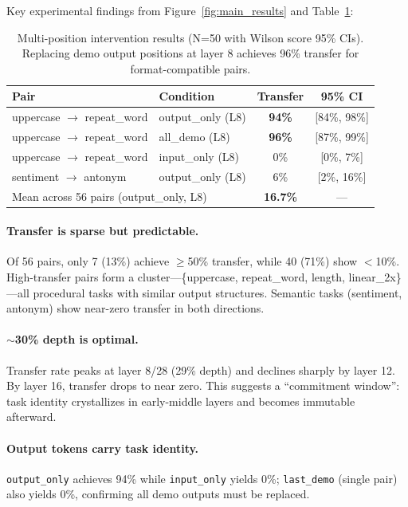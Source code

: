 \documentclass{article}
\begin{document}
Key experimental findings from Figure~\ref{fig:main_results} and Table~\ref{tab:multi}:

\begin{table}[t]
\caption{Multi-position intervention results (N=50 with Wilson score 95\% CIs). Replacing demo output positions at layer 8 achieves 96\% transfer for format-compatible pairs.}
\label{tab:multi}
\centering
\small
\begin{tabular}{@{}llcc@{}}
\toprule
Pair & Condition & Transfer & 95\% CI \\
\midrule
uppercase $\to$ repeat\_word & output\_only (L8) & \textbf{94\%} & [84\%, 98\%] \\
uppercase $\to$ repeat\_word & all\_demo (L8) & \textbf{96\%} & [87\%, 99\%] \\
uppercase $\to$ repeat\_word & input\_only (L8) & 0\% & [0\%, 7\%] \\
sentiment $\to$ antonym & output\_only (L8) & 6\% & [2\%, 16\%] \\
\midrule
\multicolumn{2}{l}{Mean across 56 pairs (output\_only, L8)} & \textbf{16.7\%} & --- \\
\bottomrule
\end{tabular}
\end{table}

\paragraph{Transfer is sparse but predictable.} Of 56 pairs, only 7 (13\%) achieve $\geq$50\% transfer, while 40 (71\%) show $<$10\%. High-transfer pairs form a cluster---\{uppercase, repeat\_word, length, linear\_2x\}---all procedural tasks with similar output structures. Semantic tasks (sentiment, antonym) show near-zero transfer in both directions.

\paragraph{$\sim$30\% depth is optimal.} Transfer rate peaks at layer 8/28 (29\% depth) and declines sharply by layer 12. By layer 16, transfer drops to near zero. This suggests a ``commitment window'': task identity crystallizes in early-middle layers and becomes immutable afterward.

\paragraph{Output tokens carry task identity.} \texttt{output\_only} achieves 94\% while \texttt{input\_only} yields 0\%; \texttt{last\_demo} (single pair) also yields 0\%, confirming all demo outputs must be replaced.
\end{document}
